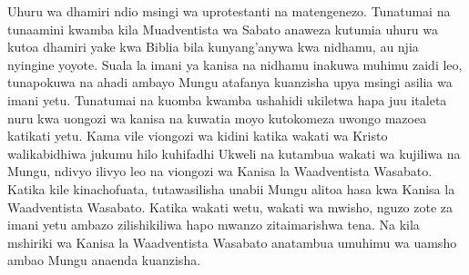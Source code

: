 Uhuru wa dhamiri ndio msingi wa uprotestanti na matengenezo. Tunatumai na tunaamini kwamba kila Muadventista wa Sabato anaweza kutumia uhuru wa kutoa dhamiri yake kwa Biblia bila kunyang'anywa kwa nidhamu, au njia nyingine yoyote. Suala la imani ya kanisa na nidhamu inakuwa muhimu zaidi leo, tunapokuwa na ahadi ambayo Mungu atafanya kuanzisha upya msingi asilia wa imani yetu. Tunatumai na kuomba kwamba ushahidi ukiletwa hapa juu italeta nuru kwa uongozi wa kanisa na kuwatia moyo kutokomeza uwongo mazoea katikati yetu. Kama vile viongozi wa kidini katika wakati wa Kristo walikabidhiwa jukumu hilo kuhifadhi Ukweli na kutambua wakati wa kujiliwa na Mungu, ndivyo ilivyo leo na viongozi wa Kanisa la Waadventista Wasabato. Katika kile kinachofuata, tutawasilisha unabii Mungu alitoa hasa kwa Kanisa la Waadventista Wasabato. Katika wakati wetu, wakati wa mwisho, nguzo zote za imani yetu ambazo zilishikiliwa hapo mwanzo zitaimarishwa tena. Na kila mshiriki wa Kanisa la Waadventista Wasabato anatambua umuhimu wa uamsho ambao Mungu anaenda kuanzisha.






